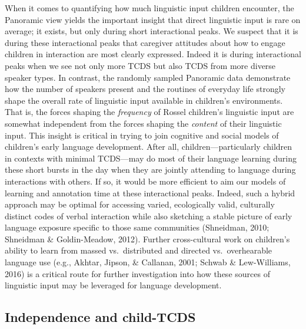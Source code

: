 \documentclass[,man,mask,floatsintext]{apa6}
\begin{document}
When it comes to quantifying how much linguistic input children
encounter, the Panoramic view yields the important insight that direct
linguistic input is rare on average; it exists, but only during short
interactional peaks. We suspect that it is during these interactional
peaks that caregiver attitudes about how to engage children in
interaction are most clearly expressed. Indeed it is during
interactional peaks when we see not only more TCDS but also TCDS from
more diverse speaker types. In contrast, the randomly sampled Panoramic
data demonstrate how the number of speakers present and the routines of
everyday life strongly shape the overall rate of linguistic input
available in children's environments. That is, the forces shaping the
\emph{frequency} of Rossel children's linguistic input are somewhat
independent from the forces shaping the \emph{content} of their
linguistic input. This insight is critical in trying to join cognitive
and social models of children's early language development. After all,
children---particularly children in contexts with minimal TCDS---may do
most of their language learning during these short bursts in the day
when they are jointly attending to language during interactions with
others. If so, it would be more efficient to aim our models of learning
and annotation time at these interactional peaks. Indeed, such a hybrid
approach may be optimal for accessing varied, ecologically valid,
culturally distinct codes of verbal interaction while also sketching a
stable picture of early language exposure specific to those same
communities (Shneidman, 2010; Shneidman \& Goldin-Meadow, 2012). Further
cross-cultural work on children's ability to learn from massed
vs.~distributed and directed vs.~overhearable language use (e.g.,
Akhtar, Jipson, \& Callanan, 2001; Schwab \& Lew-Williams, 2016) is a
critical route for further investigation into how these sources of
linguistic input may be leveraged for language development.

\subsection{Independence and
child-TCDS}\label{independence-and-child-tcds}
\end{document}
